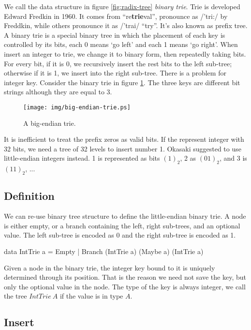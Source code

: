\documentclass[b5paper]{article}
\begin{document}
We call the data structure in figure \ref{fig:radix-tree} \emph{binary trie}. Trie is developed Edward Fredkin in 1960. It comes from ``re\textbf{trie}val'', pronounce as /'tri:/ by Freddkin, while others pronounce it as /'trai/ ``try''\cite{wiki-trie}. It's also known as prefix tree. A binary trie is a special binary tree in which the placement of each key is controlled by its bits, each 0 means `go left' and each 1 means `go right'\cite{okasaki-int-map}. When insert an integer to trie, we change it to binary form, then repeatedly taking bits. For every bit, if it is 0, we recursively insert the rest bits to the left sub-tree; otherwise if it is 1, we insert into the right sub-tree. There is a problem for integer key. Consider the binary trie in figure \ref{fig:big-endian-trie}. The three keys are different bit strings although they are equal to 3.

\begin{figure}[htbp]
  \centering
  \texttt{[image: img/big-endian-trie.ps]}
  \caption{A big-endian trie.}
  \label{fig:big-endian-trie}
\end{figure}

It is inefficient to treat the prefix zeros as valid bits. If the represent integer with 32 bits, we need a tree of 32 levels to insert number 1. Okasaki suggested to use little-endian integers instead\cite{okasaki-int-map}. 1 is represented as bits $(1)_2$, 2 as $(01)_2$, and 3 is $(11)_2$, ...

\subsection{Definition}
We can re-use binary tree structure to define the little-endian binary trie. A node is either empty, or a branch containing the left, right sub-trees, and an optional value. The left sub-tree is encoded as 0 and the right sub-tree is encoded as 1.

\lstset{frame = single}
\begin{Haskell}
data IntTrie a = Empty
               | Branch (IntTrie a) (Maybe a) (IntTrie a)
\end{Haskell}

Given a node in the binary trie, the integer key bound to it is uniquely determined through its position. That is the reason we need not save the key, but only the optional value in the node. The type of the key is always integer, we call the tree $IntTrie\ A$ if the value is in type $A$.

\subsection{Insert}
\end{document}
